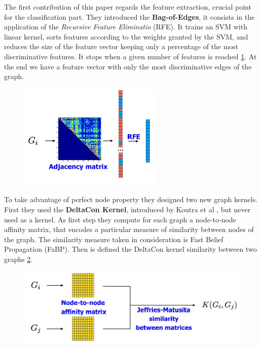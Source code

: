 The first contribution of this paper regards the feature extraction, crucial point for the classification part. They introduced the \textbf{Bag-of-Edges}, it consists in the application of the \textit{Recursive Feature Eliminatio} (RFE). It trains an SVM with linear kernel, sorts features according to the weights granted by the SVM, and reduces the size of the feature vector keeping only a percentage of the most discriminative features. It stops when a given number of features is reached \ref{fig:diagram13}. At the end we have a feature vector with only the most discriminative edges of the graph.

\begin{figure}[htbp]
	\centering
	\includegraphics[scale=0.8]{Immagini/supervised1.PNG}
	\caption{\label{fig:diagram13}}
\end{figure}
 
To take advantage of perfect node property they designed two new graph kernels. First they used the \textbf{DeltaCon Kernel}, introduced by Koutra et al \cite{koutra2013deltacon}, but never used as a kernel. As first step they compute for each graph a node-to-node affinity matrix, that encodes a particular measure of similarity between nodes of the graph. The similarity measure taken in consideration is Fast Belief Propagation (FaBP). Then is defined the DeltaCon kernel similarity between two graphs \ref{fig:diagram14}. 

\begin{figure}[htbp]
	\centering
	\includegraphics[scale=0.8]{Immagini/supervised2.PNG}
	\caption{\label{fig:diagram14}}
\end{figure}

